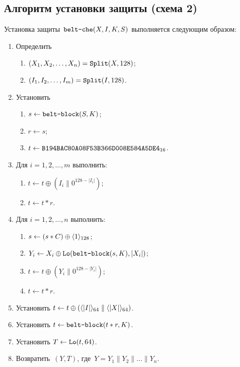 \subsection{Алгоритм установки защиты (схема 2)}\label{AE.CHE.Wrap}

Установка защиты~$\texttt{belt-che}(X,I,K,S)$ выполняется следующим образом:
\begin{enumerate}
\item
Определить 
\begin{enumerate}
\item
$(X_1,X_2,\ldots,X_n)=\mathop{\texttt{Split}}\nolimits(X, 128)$;
\item
$(I_1,I_2,\ldots,I_m)=\mathop{\texttt{Split}}\nolimits(I, 128)$. 
\end{enumerate}
\item
Установить
\begin{enumerate}
\item
$s\leftarrow\texttt{belt-block}(S,K)$;
\item
$r\leftarrow s$;
\item
$t\leftarrow\texttt{B194BAC80A08F53B366D008E584A5DE4}_{16}$.
\end{enumerate}

\item
Для $i=1,2,\ldots,m$ выполнить:
\begin{enumerate}
\item
$t\leftarrow t\oplus (I_i\parallel 0^{128-|I_i|})$;
\item
$t\leftarrow t\ast r$.
\end{enumerate}

\item
Для $i=1,2,\ldots,n$ выполнить:
\begin{enumerate}
\item
$s\leftarrow (s\ast C)\oplus\langle1\rangle_{128}$;
\item
$Y_i\leftarrow X_i\oplus\mathop{\texttt{Lo}}\nolimits(\texttt{belt-block}(s,K), |X_i|)$;
\item
$t\leftarrow t\oplus (Y_i\parallel 0^{128-|Y_i|})$;
\item
$t\leftarrow t\ast r$.
\end{enumerate}

\item
Установить
$t\leftarrow t\oplus 
(\langle|I|\rangle_{64}\parallel\langle|X|\rangle_{64})$.
\item
Установить
$t\leftarrow \texttt{belt-block}(t\ast r,K)$.
\item
Установить
$T\leftarrow \mathop{\texttt{Lo}}\nolimits(t, 64)$.
\item
Возвратить~$(Y,T)$, 
где~$Y=Y_1\parallel Y_2\parallel\ldots\parallel Y_n$.
\end{enumerate}

